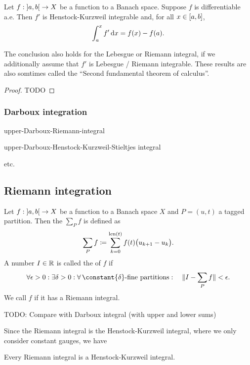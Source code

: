 \begin{proposition} \label{secondFundamentalTheoremCalculus}
Let $f: \interval[o]{a,b}\to X$ be a function to a Banach space. Suppose $f$ is differentiable a.e. Then $f'$ is Henstock-Kurzweil integrable and, for all $x\in \interval{a,b}$,
\[ \int_a^x f' \operatorname{d \!}{x} = f(x) - f(a). \]
\end{proposition}
The conclusion also holds for the Lebesgue or Riemann integral, if we additionally assume that $f'$ is Lebesgue / Riemann integrable. These results are also somtimes called the ``Second fundamental theorem of calculus''.
\begin{proof}
TODO
\end{proof}

\subsubsection{Darboux integration}
\begin{definition}
upper-Darboux-Riemann-integral

upper-Darboux-Henstock-Kurzweil-Stieltjes integral

etc.
\end{definition}

\subsection{Riemann integration}
\begin{definition}
Let $f: \interval[o]{a,b}\to X$ be a function to a Banach space $X$ and $P = (u,t)$ a tagged partition. Then the  $\sum_P f$ is defined as
\[ \sum_P f \coloneqq \sum_{k = 0}^{\operatorname{len}(t)}f(t)\big(u_{k+1} - u_{k}\big). \]
A number $I\in \mathbb{R}$ is called the  of $f$ if
\[ \forall \epsilon >0: \exists \delta>0: \forall \,\text{$\constant{\delta}$-fine partitions}: \quad \norm{I - \sum_P f} < \epsilon. \]
We call $f$  if it has a Riemann integral.
\end{definition}
TODO: Compare with Darboux integral (with upper and lower sums)


Since the Riemann integral is the Henstock-Kurzweil integral, where we only consider constant gauges, we have
\begin{lemma}
Every Riemann integral is a Henstock-Kurzweil integral.
\end{lemma}


